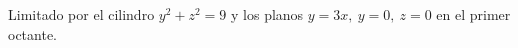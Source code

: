 \item Limitado por el cilindro $y^2 + z^2 = 9$ y los planos $y = 3x, \ y = 0, \ z = 0$ en el primer octante.
